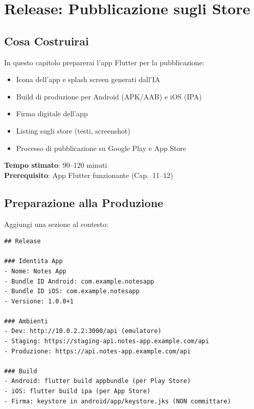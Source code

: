 \chapter{Release: Pubblicazione sugli Store}

\section*{Cosa Costruirai}
In questo capitolo preparerai l'app Flutter per la pubblicazione:
\begin{itemize}
  \item Icona dell'app e splash screen generati dall'IA
  \item Build di produzione per Android (APK/AAB) e iOS (IPA)
  \item Firma digitale dell'app
  \item Listing sugli store (testi, screenshot)
  \item Processo di pubblicazione su Google Play e App Store
\end{itemize}

\textbf{Tempo stimato}: 90--120 minuti\\
\textbf{Prerequisito}: App Flutter funzionante (Cap.~11--12)

\section{Preparazione alla Produzione}

\begin{praticabox}[title={Pratica --- Aggiorna il \texttt{\_CONTEXT.md} per il rilascio}]
Aggiungi una sezione al contesto:
\begin{lstlisting}[language={}]
## Release

### Identita App
- Nome: Notes App
- Bundle ID Android: com.example.notesapp
- Bundle ID iOS: com.example.notesapp
- Versione: 1.0.0+1

### Ambienti
- Dev: http://10.0.2.2:3000/api (emulatore)
- Staging: https://staging-api.notes-app.example.com/api
- Produzione: https://api.notes-app.example.com/api

### Build
- Android: flutter build appbundle (per Play Store)
- iOS: flutter build ipa (per App Store)
- Firma: keystore in android/app/keystore.jks (NON committare)
\end{lstlisting}
\end{praticabox}

